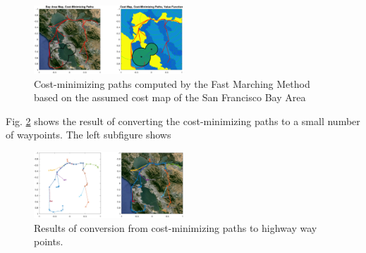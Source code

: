 \begin{figure}
	\centering
	\includegraphics[width=0.5\textwidth]{"fig/airHighway_results"}
	\caption{Cost-minimizing paths computed by the Fast Marching Method based on the assumed cost map of the San Francisco Bay Area}
	\label{fig:airHighway_results}
\end{figure}

Fig. \ref{fig:airHighway_sparse} shows the result of converting the cost-minimizing paths to a small number of waypoints. The left subfigure shows 

\begin{figure}
	\centering
	\includegraphics[width=0.5\textwidth]{"fig/airHighway_sparse"}
	\caption{Results of conversion from cost-minimizing paths to highway way points.}
	\label{fig:airHighway_sparse}
\end{figure}